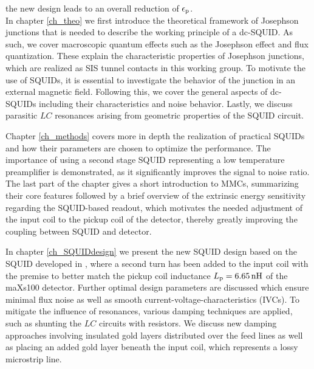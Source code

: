 the new design leads to an overall reduction of $\epsilon_{\rm p}$. \\

In chapter \ref{ch_theo} we first introduce the theoretical framework of Josephson junctions that is needed to describe the working principle of a dc-SQUID. As such, we cover macroscopic quantum effects such as the Josephson effect and flux quantization. These explain the characteristic properties of Josephson junctions, which are realized as SIS tunnel contacts in this working group. To motivate the use of SQUIDs, it is essential to investigate the behavior of the junction in an external magnetic field. Following this, we cover the general aspects of dc-SQUIDs including their characteristics and noise behavior. Lastly, we discuss parasitic $LC$ resonances arising from geometric properties of the SQUID circuit.

Chapter \ref{ch_methods} covers more in depth the realization of practical SQUIDs and how their parameters are chosen to optimize the performance. The importance of using a second stage SQUID representing a low temperature preamplifier is demonstrated, as it significantly improves the signal to noise ratio. The last part of the chapter gives a short introduction to MMCs, summarizing their core features followed by a brief overview of the extrinsic energy sensitivity regarding the SQUID-based readout, which motivates the needed adjustment of the input coil to the pickup coil of the detector, thereby greatly improving the coupling between SQUID and detector.   

In chapter \ref{ch_SQUIDdesign} we present the new SQUID design based on the SQUID developed in \cite{Bauer2022}, where a second turn has been added to the input coil with the premise to better match the pickup coil inductance $L_{\rm p}=\qty{6.65}{\nH}$ of the maXs100 detector. Further optimal design parameters are discussed which ensure minimal flux noise as well as smooth current-voltage-characteristics (IVCs). To mitigate the influence of resonances, various damping techniques are applied, such as shunting the $LC$ circuits with resistors. We discuss new damping approaches involving insulated gold layers distributed over the feed lines as well as placing an added gold layer beneath the input coil, which represents a lossy microstrip line.  

